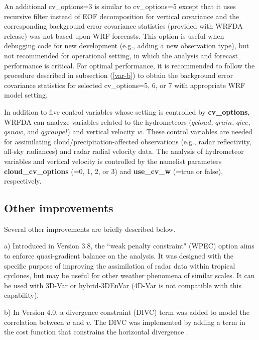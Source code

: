 An additional cv\_options=3 is similar to cv\_options=5 except that it uses recursive filter instead of EOF decomposition
for vertical covariance and the corresponding background error covariance statistics (provided with WRFDA release) 
was not based upon WRF forecasts.
This option is useful when debugging code for new development (e.g., adding a new observation type), but not recommended 
for operational setting, in which the analysis and forecast performance is critical.
For optimal performance, it is recommended to follow the procedure described in subsection (\ref{var-b}) to
obtain the background error covariance statistics for selected cv\_options=5, 6, or 7 with appropriate WRF model setting.

In addition to five control variables whose setting is controlled by {\bf cv\_options}, WRFDA can analyze variables related
to the hydrometeors ($qcloud$, $qrain$, $qice$, $qsnow$, and $qgraupel$) and vertical velocity $w$. These control variables
are needed for assimilating cloud/precipitation-affected observations (e.g., radar reflectivity, all-sky radiances) and 
radar radial velocity data. The analysis of hydrometeor variables and vertical velocity is controlled by the namelist parameters
{\bf cloud\_cv\_options} (=0, 1, 2, or 3) and {\bf use\_cv\_w} (=true or false), respectively.

\subsection{Other improvements}

Several other improvements are briefly described below.

\vspace{0.5cm}

a) Introduced in Version 3.8, the ``weak penalty constraint" (WPEC) option \citep{li15} aims to enforce quasi-gradient balance on the analysis. 
It was designed with the specific purpose of improving the assimilation of radar data within tropical cyclones, but may be useful 
for other weather phenomena of similar scales. It can be used with 3D-Var or hybrid-3DEnVar (4D-Var is not compatible with this capability).

\vspace{0.5cm}

b) In Version 4.0, a divergence constraint (DIVC) term was added to model the correlation between $u$ and $v$. The DIVC was implemented by adding a term in the cost function that constrains the horizontal divergence \citep{tong16}. 

